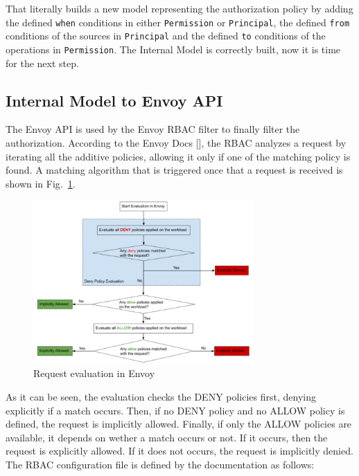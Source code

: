 \noindent That literally builds a new model representing the authorization policy by adding the defined \texttt{when} conditions in either \texttt{Permission} or \texttt{Principal}, the defined \texttt{from} conditions of the sources in \texttt{Principal} and the defined \texttt{to} conditions of the operations in \texttt{Permission}. The Internal Model is correctly built, now it is time for the next step.

\newpage

\subsection{Internal Model to Envoy API}
The Envoy API is used by the Envoy RBAC filter to finally filter the authorization. According to the Envoy Docs [], the RBAC analyzes a request by iterating all the additive policies, allowing it only if one of the matching policy is found. A matching algorithm that is triggered once that a request is received is shown in Fig.~\ref{fig:env-eval}.

\begin{figure}[ht]
    \centering
    \includegraphics[width=0.75\textwidth]{chapters/images/chp3/env-eval.png}
    \caption{Request evaluation in Envoy}
    \label{fig:env-eval}
\end{figure}

\noindent As it can be seen, the evaluation checks the DENY policies first, denying explicitly if a match occurs. Then, if no DENY policy and no ALLOW policy is defined, the request is implicitly allowed. Finally, if only the ALLOW policies are available, it depends on wether a match occurs or not. If it occurs, then the request is explicitly allowed. If it does not occurs, the request is implicitly denied.
The RBAC configuration file is defined by the documentation as follows:

